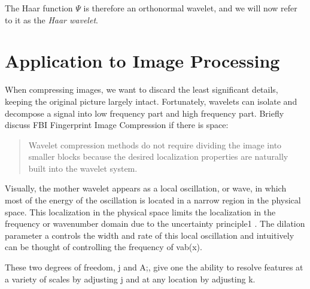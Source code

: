 \documentclass[11pt]{amsart}
\theoremstyle{theorem} %
\theoremstyle{definition}
\theoremstyle{example}
\theoremstyle{remark}
\numberwithin{equation}{section}
\begin{document}
The Haar function $ \varPsi $ is therefore an orthonormal wavelet, and we will now refer to it as the \emph{Haar wavelet}.

\section{Application to Image Processing} \label{section:application}
 When compressing images, we want to discard the least significant details, keeping the original picture largely intact. Fortunately, wavelets can isolate and decompose a signal into low frequency part and high frequency part.
 Briefly discuss FBI Fingerprint Image Compression if there is space:
\begin{quote}
 	 Wavelet compression methods do not require dividing the image into smaller blocks because the desired localization properties are naturally built into the wavelet system.\cite{frazier}
 \end{quote}

Visually, the mother
wavelet appears as a local oscillation, or wave, in which most of the
energy of the oscillation is located in a narrow region in the physical
space. This localization in the physical space limits the localization in the frequency or wavenumber domain due to the uncertainty
principle1 . The dilation parameter a controls the width and rate of
this local oscillation and intuitively can be thought of controlling the
frequency of vab(x).


These two degrees of freedom, j and A;, give one the ability to resolve
features at a variety of scales by adjusting j and at any location by
adjusting k.

\printbibliography
\end{document}
